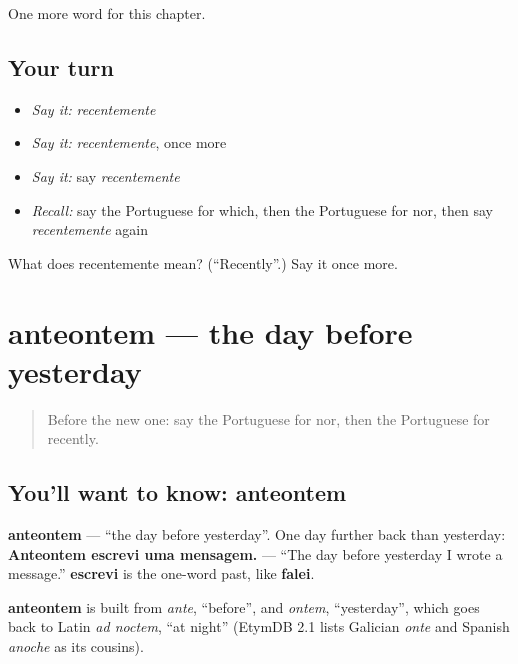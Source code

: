 \begin{grammarlens}[title={What you've built}]
One more word for this chapter.
\end{grammarlens}

\subsection*{Your turn}
\begin{itemize}
\raggedright
  \item \emph{Say it:} \emph{recentemente}
  \item \emph{Say it:} \emph{recentemente}, once more
  \item \emph{Say it:} say \emph{recentemente}
  \item \emph{Recall:} say the Portuguese for which, then the Portuguese for nor, then say \emph{recentemente} again
\end{itemize}

\begin{tcolorbox}[breakable,colback=teal!4,colframe=teal!35!black,title={Before you move on}]
What does recentemente mean? (\textquotedblleft{}Recently\textquotedblright{}.) Say it once more.
\end{tcolorbox}
\section[anteontem]{anteontem — the day before yesterday}

\label{lesson:PT-C135-anteontem}



\begin{quote}
Before the new one: say the Portuguese for nor, then the Portuguese for recently.
\end{quote}

\subsection*{You'll want to know: anteontem}
\textbf{anteontem} — \textquotedblleft{}the day before yesterday\textquotedblright{}. One day further back than yesterday: \textbf{Anteontem escrevi uma mensagem.} — \textquotedblleft{}The day before yesterday I wrote a message.\textquotedblright{} \textbf{escrevi} is the one-word past, like \textbf{falei}.

\begin{cousinweb}
\textbf{anteontem} is built from \emph{ante}, \textquotedblleft{}before\textquotedblright{}, and \emph{ontem}, \textquotedblleft{}yesterday\textquotedblright{}, which goes back to Latin \emph{ad noctem}, \textquotedblleft{}at night\textquotedblright{} (EtymDB 2.1 lists Galician \emph{onte} and Spanish \emph{anoche} as its cousins).
\end{cousinweb}

